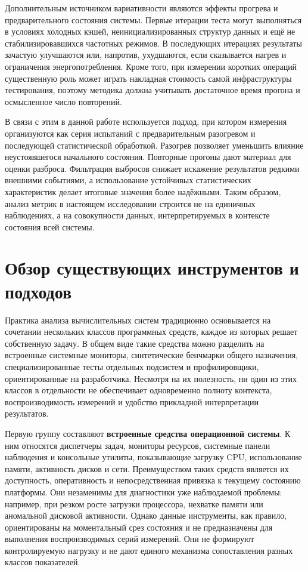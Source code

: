 Дополнительным источником вариативности являются эффекты прогрева и предварительного состояния системы. Первые итерации теста могут выполняться в условиях холодных кэшей, неинициализированных структур данных и ещё не стабилизировавшихся частотных режимов. В последующих итерациях результаты зачастую улучшаются или, напротив, ухудшаются, если сказывается нагрев и ограничения энергопотребления. Кроме того, при измерении коротких операций существенную роль может играть накладная стоимость самой инфраструктуры тестирования, поэтому методика должна учитывать достаточное время прогона и осмысленное число повторений.

В связи с этим в данной работе используется подход, при котором измерения организуются как серия испытаний с предварительным разогревом и последующей статистической обработкой. Разогрев позволяет уменьшить влияние неустоявшегося начального состояния. Повторные прогоны дают материал для оценки разброса. Фильтрация выбросов снижает искажение результатов редкими внешними событиями, а использование устойчивых статистических характеристик делает итоговые значения более надёжными. Таким образом, анализ метрик в настоящем исследовании строится не на единичных наблюдениях, а на совокупности данных, интерпретируемых в контексте состояния всей системы.

\section{Обзор существующих инструментов и подходов}

Практика анализа вычислительных систем традиционно основывается на сочетании нескольких классов программных средств, каждое из которых решает собственную задачу. В общем виде такие средства можно разделить на встроенные системные мониторы, синтетические бенчмарки общего назначения, специализированные тесты отдельных подсистем и профилировщики, ориентированные на разработчика. Несмотря на их полезность, ни один из этих классов в отдельности не обеспечивает одновременно полноту контекста, воспроизводимость измерений и удобство прикладной интерпретации результатов.

Первую группу составляют \textbf{встроенные средства операционной системы}. К ним относятся диспетчеры задач, мониторы ресурсов, системные панели наблюдения и консольные утилиты, показывающие загрузку CPU, использование памяти, активность дисков и сети. Преимуществом таких средств является их доступность, оперативность и непосредственная привязка к текущему состоянию платформы. Они незаменимы для диагностики уже наблюдаемой проблемы: например, при резком росте загрузки процессора, нехватке памяти или аномальной дисковой активности. Однако данные инструменты, как правило, ориентированы на моментальный срез состояния и не предназначены для выполнения воспроизводимых серий измерений. Они не формируют контролируемую нагрузку и не дают единого механизма сопоставления разных классов показателей.

